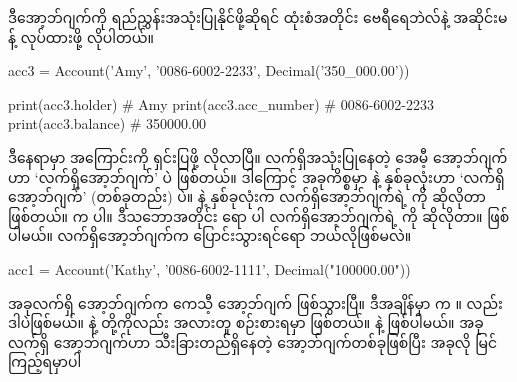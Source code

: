 ဒီအော့ဘ်ဂျက်ကို ရည်ညွှန်းအသုံးပြုနိုင်ဖို့ဆိုရင် ထုံးစံအတိုင်း ဗေရီရေဘဲလ်နဲ့ အဆိုင်းမန့် လုပ်ထားဖို့ လိုပါတယ်။ 
%
\begin{py}
acc3 = Account('Amy', '0086-6002-2233', Decimal('350_000.00'))
\end{py}
%
\betweenminted{\medskipamount}
%
\begin{py}
print(acc3.holder)      # Amy 
print(acc3.acc_number)  # 0086-6002-2233
print(acc3.balance)     # 350000.00
\end{py}
%
ဒီနေရာမှာ  အကြောင်းကို ရှင်းပြဖို့ လိုလာပြီ။ လက်ရှိအသုံးပြုနေတဲ့ အေမီ့  အော့ဘ်ဂျက်ဟာ ‘လက်ရှိအော့ဘ်ဂျက်’  ပဲ ဖြစ်တယ်။ ဒါကြောင့် အခုကိစ္စမှာ  နဲ့  နှစ်ခုလုံးဟာ ‘လက်ရှိအော့ဘ်ဂျက်’ (တစ်ခုတည်း) ပဲ။  နဲ့  နှစ်ခုလုံးက လက်ရှိအော့ဘ်ဂျက်ရဲ့  ကို ဆိုလိုတာ ဖြစ်တယ်။  က  ပါ။ ဒီသဘောအတိုင်း  ရော  ပါ လက်ရှိအော့ဘ်ဂျက်ရဲ့  ကို ဆိုလိုတာ။  ဖြစ်ပါမယ်။ လက်ရှိအော့ဘ်ဂျက်က ပြောင်းသွားရင်ရော ဘယ်လိုဖြစ်မလဲ။
%
\begin{py}
acc1 = Account('Kathy', '0086-6002-1111', Decimal("100000.00"))
\end{py}
%
အခုလက်ရှိ အော့ဘ်ဂျက်က ကေသီ့  အော့ဘ်ဂျက် ဖြစ်သွားပြီ။ ဒီအချိန်မှာ  က ။  လည်း ဒါပဲဖြစ်မယ်။  နဲ့  တို့ကိုလည်း အလားတူ စဉ်းစားရမှာ ဖြစ်တယ်။  နဲ့  ဖြစ်ပါမယ်။ အခုလက်ရှိ အော့ဘ်ဂျက်ဟာ သီးခြားတည်ရှိနေတဲ့ အော့ဘ်ဂျက်တစ်ခုဖြစ်ပြီး အခုလို မြင်ကြည့်ရမှာပါ

